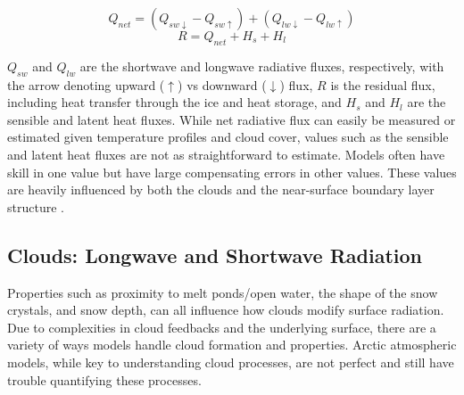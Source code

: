 \begin{equation}\label{eq:qnetintrointro}
Q_{net} = (Q_{sw \downarrow} - Q_{sw \uparrow}) + (Q_{lw \downarrow} - Q_{lw \uparrow})
\end{equation}
\begin{equation}\label{eq:r}
R = Q_{net} + H_{s} + H_{l}
\end{equation}

$Q_{sw}$ and $Q_{lw}$ are the shortwave and longwave radiative fluxes, respectively, with the arrow denoting upward ($\uparrow$) vs downward ($\downarrow$) flux, $R$ is the residual flux, including heat transfer through the ice and heat storage, and $H_{s}$ and $H_{l}$ are the sensible and latent heat fluxes. While net radiative flux can easily be measured or estimated given temperature profiles and cloud cover, values such as the sensible and latent heat fluxes are not as straightforward to estimate. Models often have skill in one value but have large compensating errors in other values. These values are heavily influenced by both the clouds and the near-surface boundary layer structure \citep{tjernstrom:2005}.

\subsection{Clouds: Longwave and Shortwave Radiation}
Properties such as proximity to melt ponds/open water, the shape of the snow crystals, and snow depth, can all influence how clouds modify surface radiation. Due to complexities in cloud feedbacks and the underlying surface, there are a variety of ways models handle cloud formation and properties. Arctic atmospheric models, while key to understanding cloud processes, are not perfect and still have trouble quantifying these processes. 

